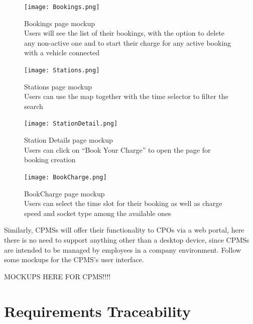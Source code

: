 \documentclass[11pt]{article}
\begin{document}
\newpage

\begin{figure}[!ht]
    \centering
    \texttt{[image: Bookings.png]}
    \captionsetup{justification=centering,margin=2cm}
    \caption{Bookings page mockup \\
    Users will see the list of their bookings, with the option to delete any non-active one and to start their charge for any active booking with a vehicle connected}
    \label{fig:my_label}
\end{figure}

\begin{figure}[!ht]
    \centering
    \texttt{[image: Stations.png]}
    \captionsetup{justification=centering,margin=2cm}
    \caption{Stations page mockup \\
    Users can use the map together with the time selector to filter the search}
    \label{fig:my_label}
\end{figure}

\newpage

\begin{figure}[!ht]
    \centering
    \texttt{[image: StationDetail.png]}
    \captionsetup{justification=centering,margin=2cm}
    \caption{Station Details page mockup \\
    Users can click on “Book Your Charge” to open the page for booking creation}
    \label{fig:my_label}
\end{figure}

\begin{figure}[!ht]
    \centering
    \texttt{[image: BookCharge.png]}
    \captionsetup{justification=centering,margin=2cm}
    \caption{BookCharge page mockup \\
    Users can select the time slot for their booking as well as charge speed and socket type among the available ones}
    \label{fig:my_label}
\end{figure}

Similarly, CPMSs will offer their functionality to CPOs via a web portal, here there is no need to support anything other than a desktop device, since CPMSs are intended to be managed by employees in a company environment. Follow some mockups for the CPMS's user interface.

MOCKUPS HERE FOR CPMS!!!!

\newpage

\section{Requirements Traceability}
\end{document}
